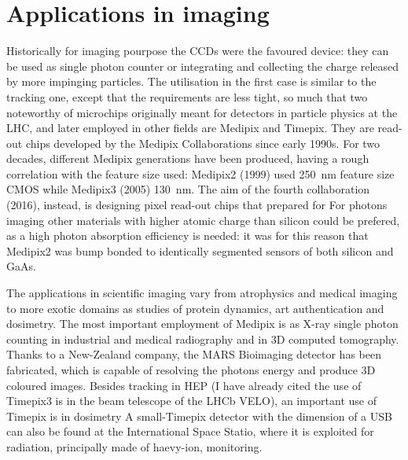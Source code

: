\section{Applications in imaging}
    Historically for imaging pourpose the CCDs were the favoured device: they can be used as single photon counter or integrating and collecting the charge released by more impinging particles. The utilisation in the first case is similar to the tracking one, except that the requirements are less tight, so much that two noteworthy of microchips originally meant for detectors in particle physics at the LHC, and later employed in other fields are Medipix and Timepix. They are read-out chips developed by the Medipix Collaborations since early 1990s. For two decades, different Medipix generations have been produced, having a rough correlation with the feature size used: Medipix2 (1999) used \SI{250}{nm} feature size CMOS while Medipix3 (2005) \SI{130}{nm}.
    The aim of the fourth collaboration (2016), instead, is designing pixel read-out chips that prepared for 
    For photons imaging other materials with higher atomic charge than silicon could be prefered, as a high photon absorption efficiency is needed: it was for this reason that Medipix2 was bump bonded to identically segmented sensors of both silicon and GaAs.
    
    The applications in scientific imaging vary from atrophysics and medical imaging to more exotic domains as studies of protein dynamics, art authentication and dosimetry.
    The most important employment of Medipix is as X-ray single photon counting in industrial and medical radiography and in 3D computed tomography. 
    Thanks to a New-Zealand company, the MARS Bioimaging detector has been fabricated, which is capable of resolving the photons energy and produce 3D coloured images.
    Besides tracking in HEP (I have already cited the use of Timepix3 is in the beam telescope of the LHCb VELO), an important use of Timepix is in dosimetry 
    A small-Timepix detector with the dimension of a USB can also be found at the International Space Statio, where it is exploited for radiation, principally made of haevy-ion, monitoring. 
 
